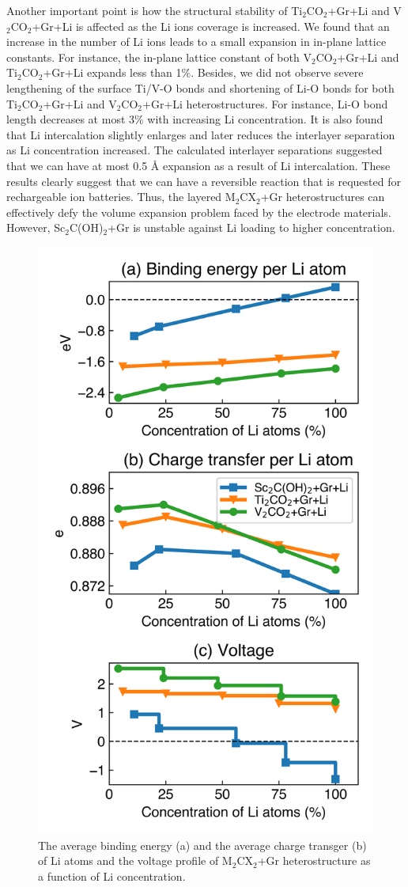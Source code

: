 Another important point is how the structural stability of Ti$_2$CO$_2$+Gr+Li and V$_2$CO$_2$+Gr+Li is affected as the Li ions coverage is increased. We found that an increase in the number of Li ions leads to a small expansion in in-plane lattice constants.  For instance, the in-plane lattice constant of both V$_2$CO$_2$+Gr+Li and Ti$_2$CO$_2$+Gr+Li expands less than 1\%.   Besides, we did not observe  severe  lengthening of the surface Ti/V-O bonds and
shortening of Li-O bonds for both Ti$_2$CO$_2$+Gr+Li and V$_2$CO$_2$+Gr+Li heterostructures. For instance,
Li-O bond length decreases at most 3\% with increasing Li concentration.   
It is also found that Li intercalation slightly enlarges and later reduces the interlayer separation as Li concentration increased. The calculated interlayer separations suggested that we can have at most 0.5 {\AA} expansion as a result of Li intercalation. 
These results clearly suggest that we can have a reversible reaction that is requested for rechargeable ion batteries. Thus, the layered M$_2$CX$_2$+Gr heterostructures can effectively defy the volume expansion problem faced by the electrode materials. However, Sc$_2$C(OH)$_2$+Gr is unstable against Li loading to higher concentration. 

\begin{figure}[htbp]
\centering
\includegraphics[width=0.7\linewidth]{Li_con.png}%
\caption{The average binding energy (a) and the average charge transger (b) of Li atoms and the voltage profile of M$_2$CX$_2$+Gr heterostructure as a function of Li concentration. \label{concenration}}
\end{figure}

